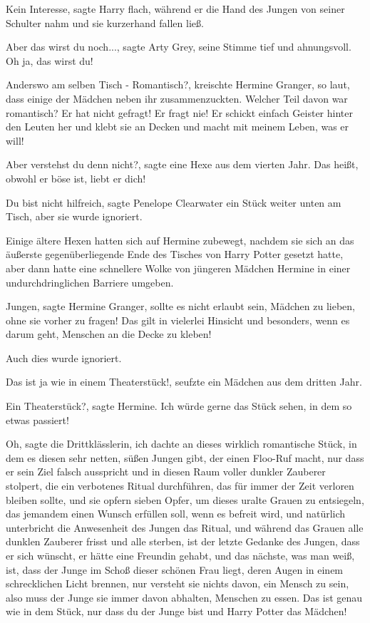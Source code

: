 \glqq{}Kein Interesse\grqq{}, sagte Harry flach, während er die Hand des Jungen
von seiner Schulter nahm und sie kurzerhand fallen ließ.

\glqq{}Aber das wirst du noch...\grqq{}, sagte Arty Grey, seine Stimme tief und
ahnungsvoll. \glqq{}Oh ja, das wirst du!\grqq{}

Anderswo am selben Tisch - \glqq{}Romantisch?\grqq{}, kreischte Hermine Granger,
so laut, dass einige der Mädchen neben ihr zusammenzuckten. \glqq{}Welcher Teil
davon war romantisch? Er hat nicht gefragt! Er fragt nie! Er schickt einfach
Geister hinter den Leuten her und klebt sie an Decken und macht mit meinem
Leben, was er will!\grqq{}

\glqq{}Aber verstehst du denn nicht?\grqq{}, sagte eine Hexe aus dem vierten
Jahr. \glqq{}Das heißt, obwohl er böse ist, liebt er dich!\grqq{}

\glqq{}Du bist nicht hilfreich\grqq{}, sagte Penelope Clearwater ein Stück weiter
unten am Tisch, aber sie wurde ignoriert.

Einige ältere Hexen hatten sich auf Hermine zubewegt, nachdem sie sich an das
äußerste gegenüberliegende Ende des Tisches von Harry Potter gesetzt hatte, aber
dann hatte eine schnellere Wolke von jüngeren Mädchen Hermine in einer
undurchdringlichen Barriere umgeben.

\glqq{}Jungen\grqq{}, sagte Hermine Granger, \glqq{}sollte es nicht erlaubt sein,
Mädchen zu lieben, ohne sie vorher zu fragen! Das gilt in vielerlei Hinsicht und
besonders, wenn es darum geht, Menschen an die Decke zu kleben!\grqq{}

Auch dies wurde ignoriert.

\glqq{}Das ist ja wie in einem Theaterstück!\grqq{}, seufzte ein Mädchen aus dem
dritten Jahr.

\glqq{}Ein Theaterstück?\grqq{}, sagte Hermine. \glqq{}Ich würde gerne das Stück
sehen, in dem so etwas passiert!\grqq{}

\glqq{}Oh\grqq{}, sagte die Drittklässlerin, \glqq{}ich dachte an dieses wirklich
romantische Stück, in dem es diesen sehr netten, süßen Jungen gibt, der einen
Floo-Ruf macht, nur dass er sein Ziel falsch ausspricht und in diesen Raum
voller dunkler Zauberer stolpert, die ein verbotenes Ritual durchführen, das für
immer der Zeit verloren bleiben sollte, und sie opfern sieben Opfer, um dieses
uralte Grauen zu entsiegeln, das jemandem einen Wunsch erfüllen soll, wenn es
befreit wird, und natürlich unterbricht die Anwesenheit des Jungen das Ritual,
und während das Grauen alle dunklen Zauberer frisst und alle sterben, ist der
letzte Gedanke des Jungen, dass er sich wünscht, er hätte eine Freundin gehabt,
und das nächste, was man weiß, ist, dass der Junge im Schoß dieser schönen Frau
liegt, deren Augen in einem schrecklichen Licht brennen, nur versteht sie nichts
davon, ein Mensch zu sein, also muss der Junge sie immer davon abhalten,
Menschen zu essen. Das ist genau wie in dem Stück, nur dass du der Junge bist
und Harry Potter das Mädchen!\grqq{}

